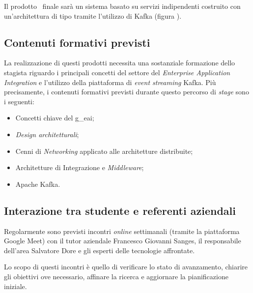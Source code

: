 Il prodotto \software\ finale sarà un sistema basato su servizi indipendenti costruito con un'architettura di tipo  tramite l'utilizzo di Kafka (figura \thefigure).

\subsection{Contenuti formativi previsti}

La realizzazione di questi prodotti necessita una sostanziale formazione dello stagista riguardo i principali concetti del settore del \textit{Enterprise Application Integration} e l'utilizzo della piattaforma di \textit{event streaming} Kafka.
Più precisamente, i contenuti formativi previsti durante questo percorso di \textit{stage} sono i seguenti:
\begin{itemize}
  \item Concetti chiave del \gls{g_eai};
  \item \textit{Design architetturali};
  \item Cenni di \textit{Networking} applicato alle architetture distribuite;
  \item Architetture di Integrazione e \textit{Middleware};
  \item Apache Kafka.
\end{itemize}

\subsection{Interazione tra studente e referenti aziendali}
Regolarmente sono previsti incontri \textit{online} settimanali (tramite la piattaforma Google Meet) con il tutor aziendale Francesco Giovanni Sanges, il responsabile dell’area  Salvatore Dore e gli esperti delle tecnologie affrontate.

Lo scopo di questi incontri è quello di verificare lo stato di avanzamento, chiarire gli obiettivi ove necessario, affinare la ricerca e aggiornare la pianificazione iniziale.




